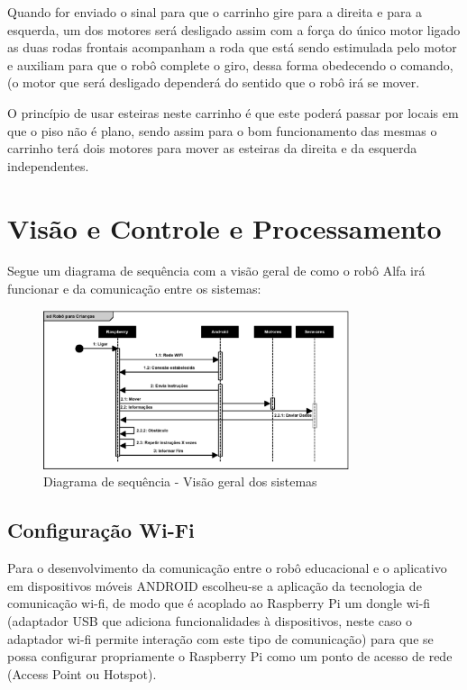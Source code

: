 Quando for enviado o sinal para que o carrinho gire para a direita e para a esquerda, um dos motores será desligado assim com a força do único motor ligado as duas rodas frontais acompanham a roda que está sendo estimulada pelo motor e auxiliam para que o robô complete o giro, dessa forma obedecendo o comando, (o motor que será desligado dependerá do sentido que o robô irá se mover.
 
O princípio de usar esteiras neste carrinho é que este poderá passar por locais em que o piso não é plano, sendo assim para o bom funcionamento das mesmas o carrinho terá dois motores  para mover as esteiras da direita e da esquerda independentes. 

\section{Visão e Controle e Processamento}

Segue um diagrama de sequência com a visão geral de como o robô Alfa irá funcionar e da comunicação entre os sistemas:

\begin{figure}[H]
    \centering
    \includegraphics[width=0.8\textwidth]{figuras/diagrama_de_sequencia.eps}
    \caption{Diagrama de sequência - Visão geral dos sistemas}
    \label{fig:catia01}
\end{figure}

\subsection{Configuração Wi-Fi}

Para o desenvolvimento da comunicação entre o robô educacional e o aplicativo em dispositivos móveis ANDROID escolheu-se a aplicação da tecnologia de comunicação wi-fi, de modo que é acoplado ao Raspberry Pi um dongle wi-fi (adaptador USB que adiciona funcionalidades à dispositivos, neste caso o adaptador wi-fi permite interação com este tipo de comunicação) para que se possa configurar propriamente o Raspberry Pi como um ponto de acesso de rede (Access Point ou Hotspot).

